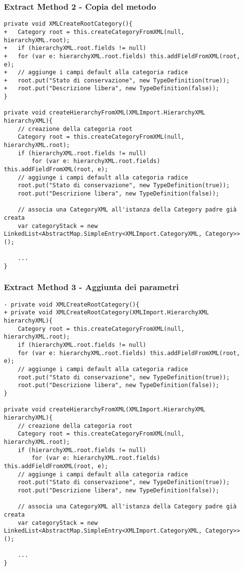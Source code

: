 \begin{frame}[fragile]
    \frametitle{Extract Method 2 - Copia del metodo}
    \begin{lstlisting}[language=tiny_diff]
private void XMLCreateRootCategory(){
+   Category root = this.createCategoryFromXML(null, hierarchyXML.root);
+   if (hierarchyXML.root.fields != null)
+   for (var e: hierarchyXML.root.fields) this.addFieldFromXML(root, e);
+   // aggiunge i campi default alla categoria radice
+   root.put("Stato di conservazione", new TypeDefinition(true));
+   root.put("Descrizione libera", new TypeDefinition(false));
}

private void createHierarchyFromXML(XMLImport.HierarchyXML hierarchyXML){
    // creazione della categoria root
    Category root = this.createCategoryFromXML(null, hierarchyXML.root);
    if (hierarchyXML.root.fields != null)
        for (var e: hierarchyXML.root.fields) this.addFieldFromXML(root, e);
    // aggiunge i campi default alla categoria radice
    root.put("Stato di conservazione", new TypeDefinition(true));
    root.put("Descrizione libera", new TypeDefinition(false));

    // associa una CategoryXML all'istanza della Category padre già creata
    var categoryStack = new LinkedList<AbstractMap.SimpleEntry<XMLImport.CategoryXML, Category>>();

    ...
}
\end{lstlisting}
\end{frame}

\begin{frame}[fragile]
    \frametitle{Extract Method 3 - Aggiunta dei parametri}
    \begin{lstlisting}[language=tiny_diff]
- private void XMLCreateRootCategory(){
+ private void XMLCreateRootCategory(XMLImport.HierarchyXML hierarchyXML){
    Category root = this.createCategoryFromXML(null, hierarchyXML.root);
    if (hierarchyXML.root.fields != null)
    for (var e: hierarchyXML.root.fields) this.addFieldFromXML(root, e);
    // aggiunge i campi default alla categoria radice
    root.put("Stato di conservazione", new TypeDefinition(true));
    root.put("Descrizione libera", new TypeDefinition(false));
}

private void createHierarchyFromXML(XMLImport.HierarchyXML hierarchyXML){
    // creazione della categoria root
    Category root = this.createCategoryFromXML(null, hierarchyXML.root);
    if (hierarchyXML.root.fields != null)
        for (var e: hierarchyXML.root.fields) this.addFieldFromXML(root, e);
    // aggiunge i campi default alla categoria radice
    root.put("Stato di conservazione", new TypeDefinition(true));
    root.put("Descrizione libera", new TypeDefinition(false));

    // associa una CategoryXML all'istanza della Category padre già creata
    var categoryStack = new LinkedList<AbstractMap.SimpleEntry<XMLImport.CategoryXML, Category>>();

    ...
}
\end{lstlisting}
\end{frame}

